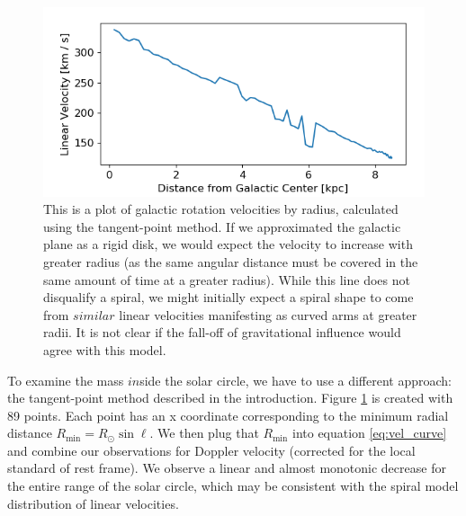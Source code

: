 \documentclass[12pt]{article}
\begin{document}

\begin{figure}
	\centering
	\includegraphics[width=.8\linewidth]{inner_vel_distro}
	\caption{This is a plot of galactic rotation velocities by radius, calculated using the tangent-point method. If we approximated the galactic plane as a rigid disk, we would expect the velocity to increase with greater radius (as the same angular distance must be covered in the same amount of time at a greater radius). While this line does not disqualify a spiral, we might initially expect a spiral shape to come from $similar$ linear velocities manifesting as curved arms at greater radii. It is not clear if the fall-off of gravitational influence would agree with this model.}
	\label{fig:inner_vel_distro}
\end{figure}

To examine the mass $in$side the solar circle, we have to use a different approach: the tangent-point method described in the introduction. Figure \ref{fig:inner_vel_distro} is created with 89 points. Each point has an x coordinate corresponding to the minimum radial distance $R_\text{min} = R_\odot \sin \ell$. We then plug that $R_\text{min}$ into equation \ref{eq:vel_curve} and combine our observations for Doppler velocity (corrected for the local standard of rest frame). We observe a linear and almost monotonic decrease for the entire range of the solar circle, which may be consistent with the spiral model distribution of linear velocities.
\end{document}
